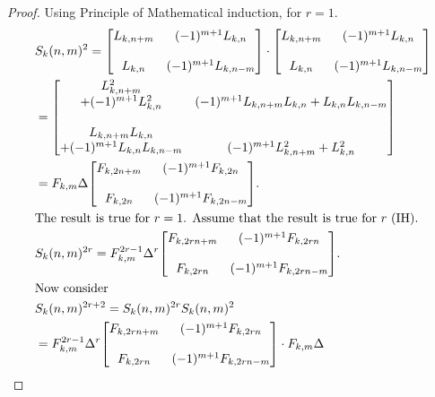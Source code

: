 \begin{proof}
Using Principle of Mathematical induction, for $r=1$. 
\begin{align*}
&S_{k}(n,m)^2= {
          \begin{bmatrix}
            L_{k,n+m} & (-1)^{m+1}L_{k,n} \bigskip\\
            L_{k,n} & (-1)^{m+1}L_{k,n-m} 
          \end{bmatrix}
     }\cdot {
          \begin{bmatrix}
            L_{k,n+m} & (-1)^{m+1}L_{k,n}\bigskip \\
            L_{k,n} & (-1)^{m+1}L_{k,n-m} 
          \end{bmatrix}
        }\\&={
          \begin{bmatrix}
            L_{k,n+m}^2\\+(-1)^{m+1}L_{k,n}^2 & (-1)^{m+1}L_{k,n+m}L_{k,n}+L_{k,n}L_{k,n-m} \bigskip\\
            L_{k,n+m}L_{k,n}\\+(-1)^{m+1}L_{k,n}L_{k,n-m} & (-1)^{m+1}L_{k,n+m}^2+L_{k,n}^2 
          \end{bmatrix}
        }\\&=F_{k,m}\Delta {
          \begin{bmatrix}
            F_{k,2n+m} & (-1)^{m+1}F_{k,2n}\bigskip \\
            F_{k,2n} & (-1)^{m+1}F_{k,2n-m} 
          \end{bmatrix}
        }.\\
        &\text{The result is true for $r=1$. Assume that the result is true for $r$ (IH)}.\\
&S_{k}(n,m)^{2r} = F_{k,m}^{2r-1}\Delta^r{
          \begin{bmatrix}
            F_{k,2rn+m} & (-1)^{m+1}F_{k,2rn}\bigskip \\
            F_{k,2rn} & (-1)^{m+1}F_{k,2rn-m} 
          \end{bmatrix}
       }.\\
&\text{Now consider}\\
&S_{k}(n,m)^{2r+2}=S_{k}(n,m)^{2r}S_{k}(n,m)^2\\&= F_{k,m}^{2r-1}\Delta^r{
          \begin{bmatrix}
            F_{k,2rn+m} & (-1)^{m+1}F_{k,2rn} \bigskip\\
            F_{k,2rn} & (-1)^{m+1}F_{k,2rn-m} 
          \end{bmatrix}
       }\cdot F_{k,m}\Delta {\
}
\end{align*}
\end{proof}

